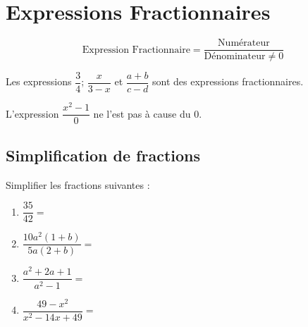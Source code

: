 \documentclass{poly}
\begin{document}
\section{Expressions Fractionnaires}
\begin{definition}
\begin{equation*}
\text{Expression Fractionnaire} = \dfrac{\text{Numérateur}}{\text{Dénominateur} \neq 0}
\end{equation*}
\end{definition}
\begin{example}

Les expressions $\dfrac{3}{4}$; $\dfrac{x}{3-x}$ et $\dfrac{a + b}{c - d}$ sont des expressions fractionnaires.

L'expression $\dfrac{x^2 - 1}{0}$ ne l'est pas à cause du $0$.
\end{example}

\subsection{Simplification de fractions}
\begin{example}
Simplifier les fractions suivantes :
\begin{enumerate}[label=\emph{\alph*})]
\item $\dfrac{35}{42} =$  \answerline
\item $\dfrac{10a^2(1 + b)}{5a(2 + b)} = $ \answerline
\item $\dfrac{a^2 + 2a + 1}{a^2 - 1} =$ \answerline
\item $\dfrac{49 - x^2}{x^2-14x+49} =$ \answerline
\end{enumerate}
\end{example}
\end{document}
